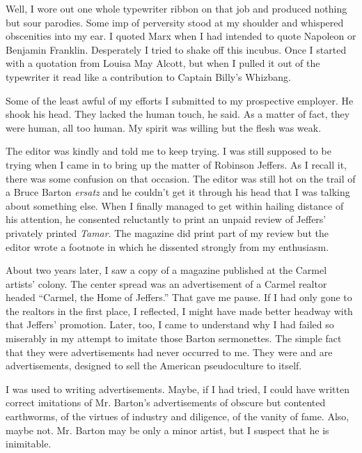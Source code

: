 \documentclass[twoside,nohyper,openany,nobib]{tufte-book}
\begin{document}
Well, I wore out one whole typewriter ribbon on that job and produced
nothing but sour parodies. Some imp of perversity stood at my shoulder
and whispered obscenities into my ear. I quoted Marx when I had intended
to quote Napoleon or Benjamin Franklin. Desperately I tried to shake off
this incubus. Once I started with a quotation from Louisa May Alcott,
but when I pulled it out of the typewriter it read like a contribution
to Captain Billy's Whizbang.

Some of the least awful of my efforts I submitted to my prospective
employer. He shook his head. They lacked the human touch, he said. As a
matter of fact, they were human, all too human. My spirit was willing
but the flesh was weak.

The editor was kindly and told me to keep trying. I was still supposed
to be trying when I came in to bring up the matter of Robinson Jeffers.
As I recall it, there was some confusion on that occasion. The editor
was still hot on the trail of a Bruce Barton \emph{ersatz} and he
couldn't get it through his head that I was talking about something
else. When I finally managed to get within hailing distance of his
attention, he consented reluctantly to print an unpaid review of
Jeffers' privately printed \emph{Tamar}. The magazine did print part of
my review but the editor wrote a footnote in which he dissented strongly
from my enthusiasm.

About two years later, I saw a copy of a magazine published at the
Carmel artists' colony. The center spread was an advertisement of a
Carmel realtor headed ``Carmel, the Home of Jeffers.'' That gave me
pause. If I had only gone to the realtors in the first place, I
reflected, I might have made better headway with that Jeffers'
promotion. Later, too, I came to understand why I had failed so
miserably in my attempt to imitate those Barton sermonettes. The simple
fact that they were advertisements had never occurred to me. They were
and are advertisements, designed to sell the American pseudoculture to
itself.

I was used to writing advertisements. Maybe, if I had tried, I could
have written correct imitations of Mr. Barton's advertisements of
obscure but contented earthworms, of the virtues of industry and
diligence, of the vanity of fame. Also, maybe not. Mr. Barton may be
only a minor artist, but I suspect that he is inimitable.
\end{document}
